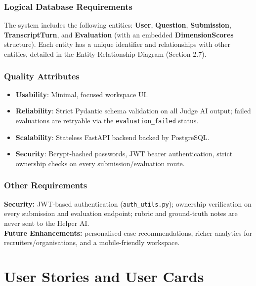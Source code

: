\documentclass[12pt,a4paper]{report}
\begin{document}
\subsubsection{Logical Database Requirements}
The system includes the following entities: \textbf{User}, \textbf{Question},
\textbf{Submission}, \textbf{TranscriptTurn}, and \textbf{Evaluation} (with an embedded
\textbf{DimensionScores} structure). Each entity has a unique identifier and relationships with
other entities, detailed in the Entity-Relationship Diagram (Section 2.7).

\subsubsection{Quality Attributes}
\begin{itemize}[nosep]
    \item \textbf{Usability}: Minimal, focused workspace UI.
    \item \textbf{Reliability}: Strict Pydantic schema validation on all Judge AI output; failed
    evaluations are retryable via the \texttt{evaluation\_failed} status.
    \item \textbf{Scalability}: Stateless FastAPI backend backed by PostgreSQL.
    \item \textbf{Security}: Bcrypt-hashed passwords, JWT bearer authentication, strict
    ownership checks on every submission/evaluation route.
\end{itemize}

\subsubsection{Other Requirements}
\textbf{Security:} JWT-based authentication (\texttt{auth\_utils.py}); ownership verification on
every submission and evaluation endpoint; rubric and ground-truth notes are never sent to the
Helper AI.\\
\textbf{Future Enhancements:} personalised case recommendations, richer analytics for
recruiters/organisations, and a mobile-friendly workspace.

\section{User Stories and User Cards}
\end{document}
